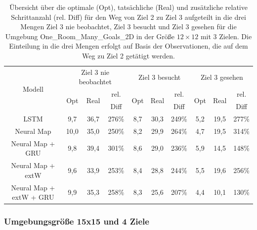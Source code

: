 \begin{table}
  \begin{tabular}{|c|c|c|c|c|c|c|c|c|c|}
    \hline
    \multirow{3}{*}{Modell} & \multicolumn{3}{|c|}{Ziel 3 nie beobachtet} & \multicolumn{3}{|c|}{Ziel 3 besucht} & \multicolumn{3}{|c|}{Ziel 3 gesehen} \\ \cline{2-10}
    & \multirow{2}{*}{Opt} & \multirow{2}{*}{Real} & rel. & \multirow{2}{*}{Opt} & \multirow{2}{*}{Real} & rel. & \multirow{2}{*}{Opt} & \multirow{2}{*}{Real} & rel. \\
    & & & Diff & & & Diff & & & Diff \\ \hline
    LSTM & 9,7 & 36,7 & 276\% & 8,7 & 30,3 & 249\% & 5,2 & 19,5 & 277\% \\ \hline
    Neural Map & 10,0 & 35,0 & 250\% & 8,2 & 29,9 & 264\% & 4,7 & 19,5 & 314\% \\ \hline
    Neural Map + GRU & 9,8 & 39,4 & 301\% & 8,6 & 29,0 & 236\% & 5,9 & 14,5 & 148\% \\ \hline
    Neural Map + extW & 9,6 & 33,9 & 253\% & 8,4 & 28,8 & 244\% & 5,5 & 19,6 & 256\% \\ \hline
    Neural Map + extW + GRU & 9,9 & 35,3 & 258\% & 8,3 & 25,6 & 207\% & 4,4 & 10,1 & 130\% \\ \hline
  \end{tabular}
  \caption{Übersicht über die optimale (Opt), tatsächliche (Real) und zusätzliche relative Schrittanzahl (rel. Diff) für den Weg von Ziel 2 zu Ziel 3 aufgeteilt in die drei Mengen \glqq Ziel 3 nie beobachtet\grqq{}, \glqq Ziel 3 besucht\grqq{} und \glqq Ziel 3 gesehen\grqq{} für die Umgebung \glqq One\_Room\_Many\_Goals\_2D\grqq{} in der Größe $12 \times 12$ mit 3 Zielen. Die Einteilung in die drei Mengen erfolgt auf Basis der Observationen, die auf dem Weg zu Ziel 2 getätigt werden.}
  \label{results12x12_2_to_3_per_M}
\end{table}



\subsubsection{Umgebungsgröße 15x15 und 4 Ziele}

